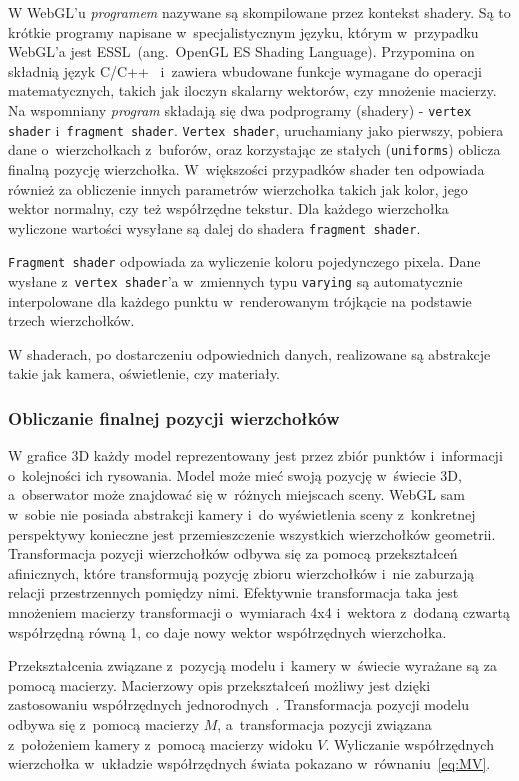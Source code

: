 W WebGL'u \textit{programem} nazywane są skompilowane przez kontekst shadery. Są to krótkie programy napisane w~specjalistycznym języku, którym w~przypadku WebGL'a jest ESSL~(ang.~OpenGL ES Shading Language). Przypomina on składnią język C/C++~\cite{ESSL} i~zawiera wbudowane funkcje wymagane do operacji matematycznych, takich jak iloczyn skalarny wektorów, czy mnożenie macierzy. Na wspomniany \textit{program} składają się dwa podprogramy (shadery) - \texttt{vertex shader} i~\texttt{fragment shader}. \texttt{Vertex shader}, uruchamiany jako pierwszy, pobiera dane o~wierzchołkach z~buforów, oraz korzystając ze stałych (\texttt{uniforms}) oblicza finalną pozycję wierzchołka. W~większości przypadków shader ten odpowiada również za obliczenie innych parametrów wierzchołka takich jak kolor, jego wektor normalny, czy też współrzędne tekstur. Dla każdego wierzchołka wyliczone wartości wysyłane są dalej do shadera \texttt{fragment shader}.

\texttt{Fragment shader} odpowiada za wyliczenie koloru pojedynczego pixela. Dane wysłane z~\texttt{vertex shader}'a w~zmiennych typu \texttt{varying} są automatycznie interpolowane dla każdego punktu w~renderowanym trójkącie na podstawie trzech wierzchołków.

W shaderach, po dostarczeniu odpowiednich danych, realizowane są abstrakcje takie jak kamera, oświetlenie, czy materiały.

\subsubsection{Obliczanie finalnej pozycji wierzchołków}

W grafice 3D każdy model reprezentowany jest przez zbiór punktów i~informacji o~kolejności ich rysowania. Model może mieć swoją pozycję w~świecie 3D, a~obserwator może znajdować się w~różnych miejscach sceny. WebGL sam w~sobie nie posiada abstrakcji kamery i~do wyświetlenia sceny z~konkretnej perspektywy konieczne jest przemieszczenie wszystkich wierzchołków geometrii. Transformacja pozycji wierzchołków odbywa się za pomocą przekształceń afinicznych, które transformują pozycję zbioru wierzchołków i~nie zaburzają relacji przestrzennych pomiędzy nimi. Efektywnie transformacja taka jest mnożeniem macierzy transformacji o~wymiarach 4x4 i~wektora z~dodaną czwartą współrzędną równą 1, co daje nowy wektor współrzędnych wierzchołka.

Przekształcenia związane z~pozycją modelu i~kamery w~świecie wyrażane są za pomocą macierzy. Macierzowy opis przekształceń możliwy jest dzięki zastosowaniu współrzędnych jednorodnych~\cite[Rozdział 5.3]{Homogeneous}. Transformacja pozycji modelu odbywa się z~pomocą macierzy $M$, a~transformacja pozycji związana z~położeniem kamery z~pomocą macierzy widoku $V$. Wyliczanie współrzędnych wierzchołka w~układzie współrzędnych świata pokazano w~równaniu~\ref{eq:MV}.

